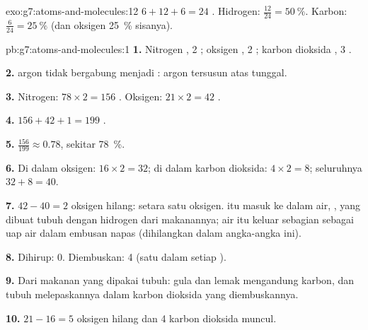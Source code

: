 \begin{solution}{exo:g7:atoms-and-molecules:12}
$6 + 12 + 6 = 24$ . Hidrogen: $\frac{12}{24} = \qty{50}{\percent}$.
Karbon: $\frac{6}{24} = \qty{25}{\percent}$ (dan oksigen
\qty{25}{\percent} sisanya).
\end{solution}

\begin{solution}{pb:g7:atoms-and-molecules:1}
\textbf{1.} Nitrogen , 2 ; oksigen , 2 ; karbon
dioksida , 3 .

\textbf{2.}  argon tidak bergabung menjadi : argon
tersusun atas  tunggal.

\textbf{3.} Nitrogen: $78 \times 2 = 156$ . Oksigen: $21\times 2 =
42$ .

\textbf{4.} $156 + 42 + 1 = 199$ .

\textbf{5.} $\frac{156}{199} \approx 0.78$, sekitar \qty{78}{\percent}.

\textbf{6.} Di dalam  oksigen: $16\times 2 = 32$; di dalam
 karbon dioksida: $4 \times 2 = 8$; seluruhnya $32 + 8 = 40$.

\textbf{7.} $42 - 40 = 2$  oksigen hilang: setara satu 
oksigen.  itu masuk ke dalam  air, , yang dibuat
tubuh dengan hidrogen dari makanannya; air itu keluar sebagian sebagai
uap air dalam embusan napas (dihilangkan dalam angka-angka ini).

\textbf{8.} Dihirup: 0. Diembuskan: 4 (satu dalam setiap ).

\textbf{9.} Dari makanan yang dipakai tubuh: gula dan lemak mengandung
 karbon, dan tubuh melepaskannya dalam karbon dioksida yang
diembuskannya.

\textbf{10.} $21 - 16 = 5$  oksigen hilang dan 4  karbon
dioksida muncul.


\end{solution}
